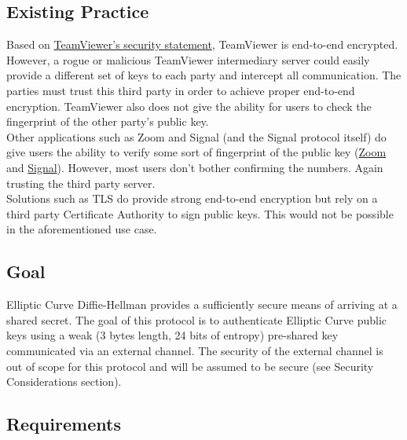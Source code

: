\documentclass{article}
\begin{document}
    \subsection{Existing Practice}

    Based on \href{https://static.teamviewer.com/resources/2017/07/TeamViewer-Security-Statement-en.pdf}{TeamViewer's
    security statement},
    TeamViewer is end-to-end encrypted. However, a rogue or malicious TeamViewer
    intermediary server could easily provide a different set of keys to each party
    and intercept all communication. The parties must trust this third party in
    order to achieve proper end-to-end encryption. TeamViewer also does not give the
    ability for users to check the fingerprint of the other party's public key.\\

    Other applications such as Zoom and Signal (and the Signal protocol itself) do
    give users the ability to verify some sort of fingerprint of the public key
    (\href{https://support.zoom.us/hc/en-us/articles/360048660871-End-to-end-E2EE-encryption-for-meetings
#h_01ENGDKFFBKTF796CE03FTCH6J}{Zoom}
    and \href{https://signal.org/blog/safety-number-updates/}{Signal}). However, most
    users don't bother confirming the numbers. Again trusting the third party
    server.\\

    Solutions such as TLS do provide strong end-to-end encryption but rely on a
    third party Certificate Authority to sign public keys. This would not be
    possible in the aforementioned use case.\\

    \subsection{Goal}

    Elliptic Curve Diffie-Hellman provides a sufficiently secure means of arriving
    at a shared secret. The goal of this protocol is to authenticate Elliptic Curve public keys
    using a weak (3 bytes length, 24 bits of entropy) pre-shared key communicated
    via an external channel. The security of the external channel is out of scope
    for this protocol and will be assumed to be secure (see Security Considerations
    section).\\

    \subsection{Requirements}
\end{document}

